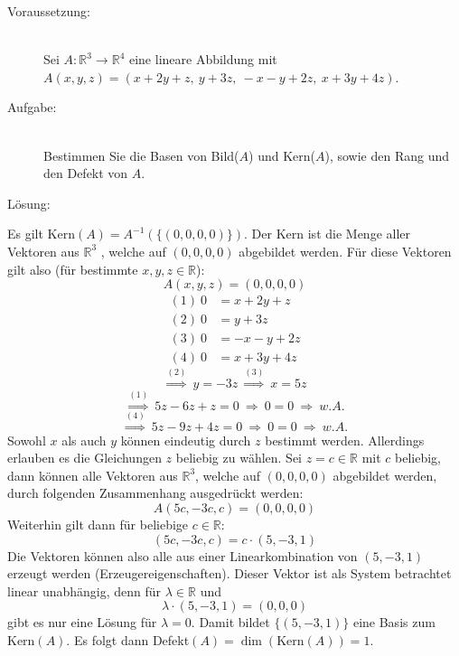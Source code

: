\documentclass[10pt, a4paper]{article}
\begin{document}
		\begin{description}
			\item[Voraussetzung:]\hfill \\
				Sei $A:\mathbb{R}^3 \longrightarrow \mathbb{R}^4$ eine lineare Abbildung mit\\
				$A(x,y,z)=(x+2y+z,\ y+3z,\ -x-y+2z,\ x+3y+4z)$.
			\item[Aufgabe:]\hfill \\
				Bestimmen Sie die Basen von Bild($A$) und Kern($A$), sowie den Rang und den Defekt von $A$.
			\item[Lösung:]
		\end{description}

		Es gilt Kern$(A) = A^{-1}(\{ (0,0,0,0) \})$. Der Kern ist die Menge aller Vektoren aus $\mathbb{R}^3$ , welche auf $(0,0,0,0)$ abgebildet werden. Für diese Vektoren gilt also (für bestimmte $x,y,z \in \mathbb{R}$):
		\[
			A(x,y,z) = (0,0,0,0)
		\]
		\begin{align*}
			(1) \ 0 &= x+2y+z\\
			(2) \ 0 &= y+3z\\
			(3) \ 0 &= -x-y+2z\\
			(4) \ 0 &= x+3y+4z
		\end{align*}
		\[
			\stackrel{(2)}{\Rightarrow} \ y = -3z \ \stackrel{(3)}{\Rightarrow} \ x = 5z
		\]
		\[
			\stackrel{(1)}{\Rightarrow} \ 5z-6z+z=0 \ \Rightarrow \ 0=0 \ \Rightarrow \ w.A. 
		\]
		\[
			\stackrel{(4)}{\Rightarrow} \ 5z-9z+4z=0 \ \Rightarrow \ 0=0 \ \Rightarrow \ w.A.
		\]
		Sowohl $x$ als auch $y$ können eindeutig durch $z$ bestimmt werden. Allerdings erlauben es die Gleichungen $z$ beliebig zu wählen.
		Sei $z = c \in \mathbb{R}$ mit $c$ beliebig, dann können alle Vektoren aus $\mathbb{R}^3$, welche auf $(0,0,0,0)$ abgebildet werden, durch folgenden Zusammenhang ausgedrückt werden:
		\[
			A(5c,-3c,c) = (0,0,0,0)
		\]
		Weiterhin gilt dann für beliebige $c \in \mathbb{R}$:
		\[
			(5c,-3c,c) = c\cdot(5,-3,1)
		\]
		Die Vektoren können also alle aus einer Linearkombination von $(5,-3,1)$ erzeugt werden (Erzeugereigenschaften). Dieser Vektor ist als System betrachtet linear unabhängig, denn für $\lambda \in \mathbb{R}$ und
		\[
		 	\lambda\cdot(5,-3,1) = (0,0,0)
		\] 
		gibt es nur eine Lösung für $\lambda = 0$. Damit bildet $\{(5,-3,1)\}$ eine Basis zum Kern$(A)$. Es folgt dann Defekt$(A) = \dim(\text{Kern}(A)) = 1$.
\end{document}
